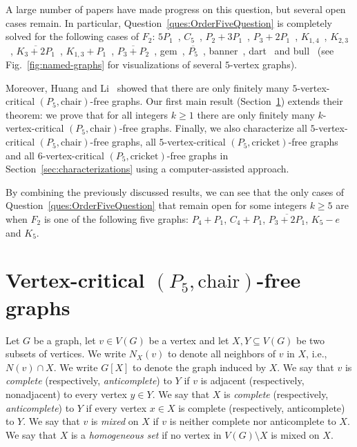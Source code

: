 \documentclass[10pt]{article}
\theoremstyle{definition}
\begin{document}
A large number of papers have made progress on this question, but several open cases remain. In particular, Question~\ref{ques:OrderFiveQuestion} is completely solved for the following cases of $F_2$: $5P_1$~\cite{R30}, $C_5$~\cite{CH23, HMRSV15}, $P_2+3P_1$~\cite{CHS22}, $P_3+2P_1$~\cite{ACHS24}, $K_{1,4}$~\cite{KP17}, $K_{2,3}$~\cite{KP17}, $\overline{K_3+2P_1}$~\cite{XJGH25a}, $K_{1,3}+P_1$~\cite{XJGH25a}, $\overline{P_3+P_2}$~\cite{CGH23}, gem~\cite{CGH23}, $\overline{P_5}$~\cite{DHHMMP17}, banner~\cite{BGS22}, dart~\cite{XJGH25b} and bull~\cite{BH26} (see Fig.~\ref{fig:named-graphs} for visualizations of several $5$-vertex graphs).

Moreover, Huang and Li~\cite{HL23} showed that there are only finitely many $5$-vertex-critical $(P_5,\text{chair})$-free graphs. Our first main result (Section~\ref{sec:chair}) extends their theorem: we prove that for all integers $k \geq 1$ there are only finitely many $k$-vertex-critical $(P_5,\text{chair})$-free graphs. Finally, we also characterize all $5$-vertex-critical $(P_5,\text{chair})$-free graphs, all $5$-vertex-critical $(P_5,\text{cricket})$-free graphs and all $6$-vertex-critical $(P_5,\text{cricket})$-free graphs in Section~\ref{sec:characterizations} using a computer-assisted approach.

By combining the previously discussed results, we can see that the only cases of Question~\ref{ques:OrderFiveQuestion} that remain open for some integers $k \geq 5$ are when $F_2$ is one of the following five graphs: $P_4+P_1$, $C_4+P_1$, $\overline{P_3+2P_1}$, $K_5-e$ and $K_5$.

\section{Vertex-critical $(P_5,\text{chair})$-free graphs}
\label{sec:chair}
Let $G$ be a graph, let $v \in V(G)$ be a vertex and let $X, Y \subseteq V(G)$ be two subsets of vertices. We write $N_X(v)$ to denote all neighbors of $v$ in $X$, i.e., $N(v) \cap X$. We write $G[X]$ to denote the graph induced by $X$. We say that $v$ is \textit{complete} (respectively, \textit{anticomplete}) to $Y$ if $v$ is adjacent (respectively, nonadjacent) to every vertex $y \in Y$. We say that $X$ is \textit{complete} (respectively, \textit{anticomplete}) to $Y$ if every vertex $x \in X$ is complete (respectively, anticomplete) to $Y$. We say that $v$ is \textit{mixed} on $X$ if $v$ is neither complete nor anticomplete to $X$. We say that $X$ is a \textit{homogeneous set} if no vertex in $V(G) \setminus X$ is mixed on $X$. 
\end{document}
